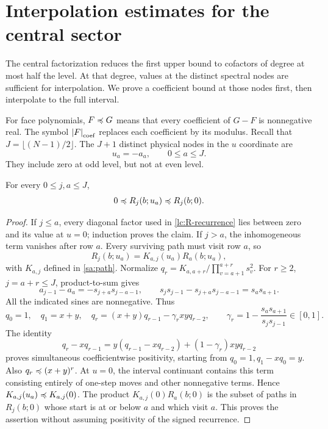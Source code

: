 \section{Interpolation estimates for the central sector}\label{lc:nodal}
The central factorization reduces the first upper bound to cofactors
of degree at most half the level. At that degree, values at the distinct
spectral nodes are sufficient for interpolation. We prove a coefficient
bound at those nodes first, then interpolate to the full interval.

For face polynomials, \(F\preccurlyeq G\) means that every coefficient of
\(G-F\) is nonnegative real. The symbol \(\left|F\right|_{\rm coef}\) replaces each
coefficient by its modulus. Recall that \(J=\lfloor(N-1)/2\rfloor\).
The \(J+1\) distinct physical nodes in the \(u\) coordinate are
\[
                         u_a=-a_a,\qquad 0\le a\le J.
\]
They include zero at odd level, but not at even level.

\begin{lemma}\label{lc:nodal-positive}
For every \(0\le j,a\le J\),
\[
                    0\preccurlyeq R_j(b;u_a)\preccurlyeq R_j(b;0).
\]
\end{lemma}
\begin{proof}
If \(j\le a\), every diagonal factor used in \eqref{lc:R-recurrence}
lies between zero and its value at \(u=0\); induction proves the claim.
If \(j>a\), the inhomogeneous term vanishes after row \(a\).
Every surviving path must visit row \(a\), so
\[
                    R_j(b;u_a)=K_{a,j}(u_a)R_a(b;u_a),
\]
with $K_{a,j}$ defined in \eqref{sa:path}.
Normalize \(q_r=K_{a,a+r}/\prod_{v=a+1}^{a+r}s_v^2\).
For \(r\ge2\), \(j=a+r\le J\), product-to-sum gives
\[
 a_{j-1}-a_a=-s_{j+a}s_{j-a-1},\qquad
 s_js_{j-1}-s_{j+a}s_{j-a-1}=s_as_{a+1}.
\]
All the indicated sines are nonnegative. Thus
\begin{equation}\label{lc:tail-node}
 q_0=1,\quad q_1=x+y,\quad
 q_r=(x+y)q_{r-1}-\gamma_rxyq_{r-2},\qquad
 \gamma_r=1-\frac{s_as_{a+1}}{s_js_{j-1}}\in[0,1].
\end{equation}
The identity
\[
 q_r-xq_{r-1}
 =y(q_{r-1}-xq_{r-2})+(1-\gamma_r)xyq_{r-2}
\]
proves simultaneous coefficientwise positivity, starting from
\(q_0=1,q_1-xq_0=y\). Also \(q_r\preccurlyeq(x+y)^r\).
At \(u=0\), the interval continuant contains this term consisting entirely of one-step moves
and other nonnegative terms. Hence \(K_{a,j}(u_a)\preccurlyeq K_{a,j}(0)\).
The product \(K_{a,j}(0)R_a(b;0)\) is the subset of paths in \(R_j(b;0)\)
whose start is at or below \(a\) and which visit \(a\). This proves
the assertion without assuming positivity of the signed recurrence.
\end{proof}

